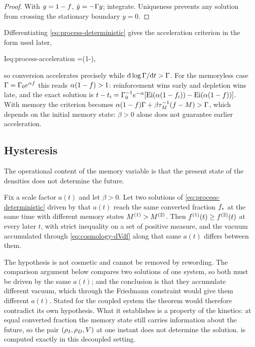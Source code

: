 \begin{proof}
  With $y=1-f$, $\dot y=-\Gamma y$; integrate. Uniqueness prevents any
  solution from crossing the stationary boundary $y=0$.
\end{proof}

Differentiating \cref{eq:process-deterministic} gives the acceleration
criterion in the form used later,
%
\begin{keyresult}{I}{eq:process-acceleration}
  \ddot \fconv=(1-\fconv)\Gam{} ,
\end{keyresult}
%
so conversion accelerates precisely while $\mathrm{d}\log\Gamma/\mathrm{d} t>\Gamma$. For the
memoryless case $\Gamma=\Gamma_{0} e^{\alpha f}$ this reads
$\alpha(1-f)>1$: reinforcement wins early and depletion wins late, and
the exact solution is
$t-t_i=\Gamma_{0}^{-1}e^{-\alpha}[\operatorname{Ei}(\alpha(1-f_i))-\operatorname{Ei}(\alpha(1-f))]$.
With memory the criterion becomes
$\alpha(1-f)\Gamma+\beta\tau_{M}^{-1}(f-M)>\Gamma$, which depends on the
initial memory state: $\beta>0$ alone does not guarantee earlier acceleration.

\subsection{Hysteresis}\label{sec:process-hysteresis}

The operational content of the memory variable is that the present state of the
densities does not determine the future.

\begin{theorem}
  \label{thm:hysteresis}
  Fix a scale factor $a(t)$ and let $\beta>0$. Let two solutions of
  \cref{eq:process-deterministic} driven by that $a(t)$ reach the same
  converted fraction $f_*$ at the same time with different memory states
  $M^{(1)}>M^{(2)}$. Then $f^{(1)}(t)\ge f^{(2)}(t)$ at every
  later $t$, with strict inequality on a set of positive measure, and the
  vacuum accumulated through \cref{eq:cosmology-dVdf} along that same $a(t)$
  differs between them.
\end{theorem}

\begin{remark}
  \label{rem:hysteresis-prescribed}
  The hypothesis is not cosmetic and cannot be removed by rewording. The
  comparison argument below compares two solutions of one system, so both must
  be driven by the same $a(t)$; and the conclusion is that they accumulate
  different vacuum, which through the Friedmann constraint would give them
  different $a(t)$. Stated for the coupled system the theorem would therefore
  contradict its own hypothesis. What it establishes is a property of the
  kinetics: at equal converted fraction the memory state still carries
  information about the future, so the pair $(\rho_{I},\rho_{D},V)$ at one
  instant does not determine the solution.  is computed
  exactly in this decoupled setting.
\end{remark}

